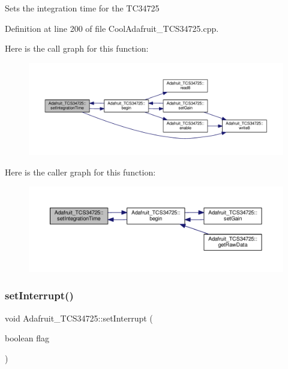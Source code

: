 Sets the integration time for the T\+C34725 

Definition at line 200 of file Cool\+Adafruit\+\_\+\+T\+C\+S34725.\+cpp.

Here is the call graph for this function\+:
\nopagebreak
\begin{figure}[H]
\begin{center}
\leavevmode
\includegraphics[width=350pt]{class_adafruit___t_c_s34725_a3c89fe5d4eea1f24f31d1afa9de8f0f3_cgraph}
\end{center}
\end{figure}
Here is the caller graph for this function\+:
\nopagebreak
\begin{figure}[H]
\begin{center}
\leavevmode
\includegraphics[width=350pt]{class_adafruit___t_c_s34725_a3c89fe5d4eea1f24f31d1afa9de8f0f3_icgraph}
\end{center}
\end{figure}
\mbox{\label{class_adafruit___t_c_s34725_ae477b116ac93cf075be20637207aee57}} 
\subsubsection{\texorpdfstring{set\+Interrupt()}{setInterrupt()}}
{\footnotesize\ttfamily void Adafruit\+\_\+\+T\+C\+S34725\+::set\+Interrupt (\begin{DoxyParamCaption}\item[{boolean}]{flag }\end{DoxyParamCaption})}



